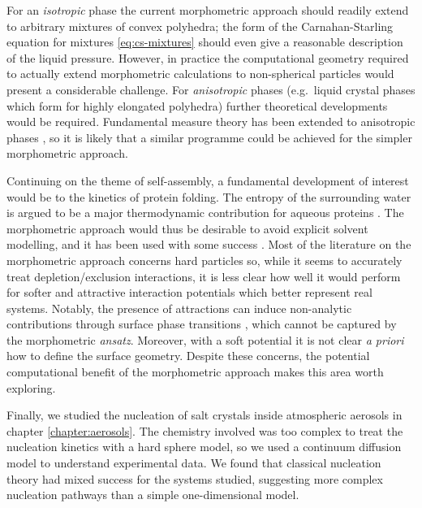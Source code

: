\documentclass[11pt,twoside]{report}
\begin{document}
For an \emph{isotropic} phase the current morphometric approach should readily extend to arbitrary mixtures of convex polyhedra; the form of the Carnahan-Starling equation for mixtures \eqref{eq:cs-mixtures} should even give a reasonable description of the liquid pressure.
However, in practice the computational geometry required to actually extend morphometric calculations to non-spherical particles would present a considerable challenge.
For \emph{anisotropic} phases (e.g.\ liquid crystal phases which form for highly elongated polyhedra) further theoretical developments would be required.
Fundamental measure theory has been extended to anisotropic phases \cite{Hansen-GoosPRL2009,Hansen-GoosJPCM2010,WittmannEL2015,WittmannPRE2015,WittmannJPCM2016}, so it is likely that a similar programme could be achieved for the simpler morphometric approach.

Continuing on the theme of self-assembly, a fundamental development of interest would be to the kinetics of protein folding.
The entropy of the surrounding water is argued to be a major thermodynamic contribution for aqueous proteins \cite{HaranoCPL2004,HaranoBJ2005,KinoshitaCES2006}.
The morphometric approach would thus be desirable to avoid explicit solvent modelling, and it has been used with some success \cite{HaranoCPL2006,RothPRL2006,KodamaJCP2011}.
Most of the literature on the morphometric approach concerns hard particles so, while it seems to accurately treat depletion/exclusion interactions, it is less clear how well it would perform for softer and attractive interaction potentials which better represent real systems.
Notably, the presence of attractions can induce non-analytic contributions through surface phase transitions \cite{EvansELE2003,EvansJCP2004}, which cannot be captured by the morphometric \emph{ansatz}.
Moreover, with a soft potential it is not clear \emph{a priori} how to define the surface geometry.
Despite these concerns, the potential computational benefit of the morphometric approach makes this area worth exploring.

Finally, we studied the nucleation of salt crystals inside atmospheric aerosols in chapter \ref{chapter:aerosols}.
The chemistry involved was too complex to treat the nucleation kinetics with a hard sphere model, so we used a continuum diffusion model to understand experimental data.
We found that classical nucleation theory had mixed success for the systems studied, suggesting more complex nucleation pathways than a simple one-dimensional model.
\end{document}
